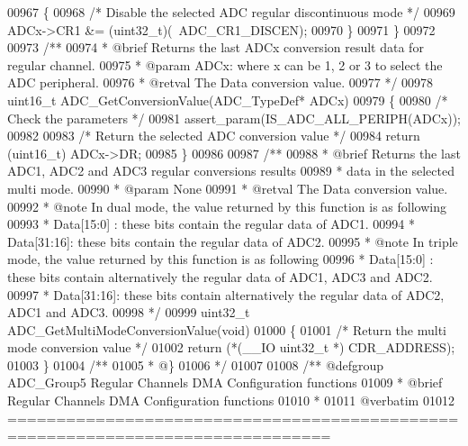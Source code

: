 \begin{DoxyCode}
00967   \{
00968     \textcolor{comment}{/* Disable the selected ADC regular discontinuous mode */}
00969     ADCx->CR1 &= (uint32\_t)(~ADC_CR1_DISCEN);
00970   \}
00971 \}
00972 
00973 \textcolor{comment}{/**}
00974 \textcolor{comment}{  * @brief  Returns the last ADCx conversion result data for regular channel.}
00975 \textcolor{comment}{  * @param  ADCx: where x can be 1, 2 or 3 to select the ADC peripheral.}
00976 \textcolor{comment}{  * @retval The Data conversion value.}
00977 \textcolor{comment}{  */}
00978 uint16\_t ADC_GetConversionValue(ADC\_TypeDef* ADCx)
00979 \{
00980   \textcolor{comment}{/* Check the parameters */}
00981   assert_param(IS\_ADC\_ALL\_PERIPH(ADCx));
00982 
00983   \textcolor{comment}{/* Return the selected ADC conversion value */}
00984   \textcolor{keywordflow}{return} (uint16\_t) ADCx->DR;
00985 \}
00986 
00987 \textcolor{comment}{/**}
00988 \textcolor{comment}{  * @brief  Returns the last ADC1, ADC2 and ADC3 regular conversions results }
00989 \textcolor{comment}{  *         data in the selected multi mode.}
00990 \textcolor{comment}{  * @param  None  }
00991 \textcolor{comment}{  * @retval The Data conversion value.}
00992 \textcolor{comment}{  * @note   In dual mode, the value returned by this function is as following}
00993 \textcolor{comment}{  *           Data[15:0] : these bits contain the regular data of ADC1.}
00994 \textcolor{comment}{  *           Data[31:16]: these bits contain the regular data of ADC2.}
00995 \textcolor{comment}{  * @note   In triple mode, the value returned by this function is as following}
00996 \textcolor{comment}{  *           Data[15:0] : these bits contain alternatively the regular data of ADC1, ADC3 and ADC2.}
00997 \textcolor{comment}{  *           Data[31:16]: these bits contain alternatively the regular data of ADC2, ADC1 and ADC3.  
               }
00998 \textcolor{comment}{  */}
00999 uint32\_t ADC_GetMultiModeConversionValue(\textcolor{keywordtype}{void})
01000 \{
01001   \textcolor{comment}{/* Return the multi mode conversion value */}
01002   \textcolor{keywordflow}{return} (*(\_\_IO uint32\_t *) CDR_ADDRESS);
01003 \}
01004 \textcolor{comment}{/**}
01005 \textcolor{comment}{  * @\}}
01006 \textcolor{comment}{  */}
01007 
01008 \textcolor{comment}{/** @defgroup ADC\_Group5 Regular Channels DMA Configuration functions}
01009 \textcolor{comment}{ *  @brief   Regular Channels DMA Configuration functions }
01010 \textcolor{comment}{ *}
01011 \textcolor{comment}{@verbatim   }
01012 \textcolor{comment}{ ===============================================================================}

\end{DoxyCode}
